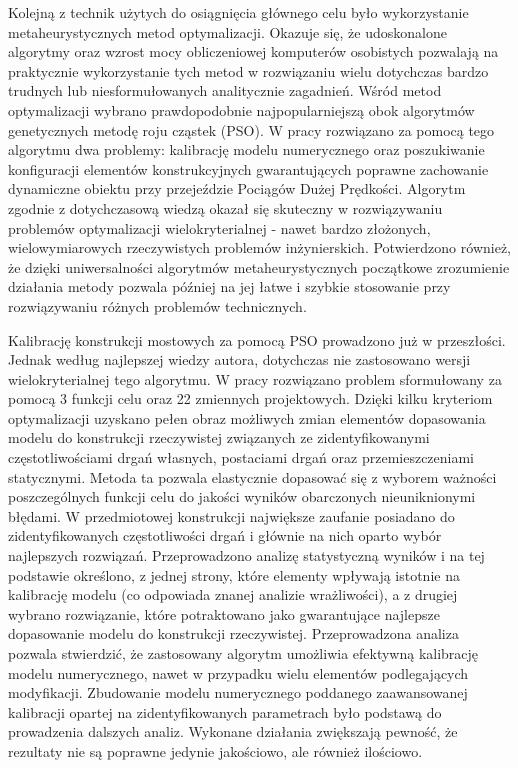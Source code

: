 Kolejną z technik użytych do osiągnięcia głównego celu było wykorzystanie metaheurystycznych metod optymalizacji. Okazuje się, że udoskonalone algorytmy oraz wzrost mocy obliczeniowej komputerów osobistych pozwalają na praktycznie wykorzystanie tych metod w rozwiązaniu wielu dotychczas bardzo trudnych lub niesformułowanych analitycznie zagadnień. Wśród metod optymalizacji wybrano prawdopodobnie najpopularniejszą obok algorytmów genetycznych metodę roju cząstek (PSO). W pracy rozwiązano za pomocą tego algorytmu dwa problemy: kalibrację modelu numerycznego oraz poszukiwanie konfiguracji elementów konstrukcyjnych gwarantujących poprawne zachowanie dynamiczne obiektu przy przejeździe Pociągów Dużej Prędkości. Algorytm zgodnie z dotychczasową wiedzą okazał się skuteczny w rozwiązywaniu problemów optymalizacji wielokryterialnej - nawet bardzo złożonych, wielowymiarowych rzeczywistych problemów inżynierskich. Potwierdzono również, że dzięki uniwersalności algorytmów metaheurystycznych początkowe zrozumienie działania metody pozwala później na jej łatwe i szybkie stosowanie przy rozwiązywaniu różnych problemów technicznych. 

Kalibrację konstrukcji mostowych za pomocą PSO prowadzono już w przeszłości. Jednak według najlepszej wiedzy autora, dotychczas nie zastosowano wersji wielokryterialnej tego algorytmu. W pracy rozwiązano problem sformułowany za pomocą 3 funkcji celu oraz 22 zmiennych projektowych. Dzięki kilku kryteriom optymalizacji uzyskano pełen obraz możliwych zmian elementów dopasowania modelu do konstrukcji rzeczywistej związanych ze zidentyfikowanymi częstotliwościami drgań własnych, postaciami drgań oraz przemieszczeniami statycznymi. Metoda ta pozwala elastycznie dopasować się z wyborem ważności poszczególnych funkcji celu do jakości wyników obarczonych nieuniknionymi błędami. W przedmiotowej konstrukcji największe zaufanie posiadano do zidentyfikowanych częstotliwości drgań i głównie na nich oparto wybór najlepszych rozwiązań. Przeprowadzono analizę statystyczną wyników i na tej podstawie określono, z jednej strony, które elementy wpływają istotnie na kalibrację modelu (co odpowiada znanej analizie wrażliwości), a z drugiej wybrano rozwiązanie, które potraktowano jako gwarantujące najlepsze dopasowanie modelu do konstrukcji rzeczywistej. Przeprowadzona analiza pozwala stwierdzić, że zastosowany algorytm umożliwia efektywną kalibrację modelu numerycznego, nawet w przypadku wielu elementów podlegających modyfikacji. Zbudowanie modelu numerycznego poddanego zaawansowanej kalibracji opartej na zidentyfikowanych parametrach było podstawą do prowadzenia dalszych analiz. Wykonane działania zwiększają pewność, że rezultaty nie są poprawne jedynie jakościowo, ale również ilościowo. 

